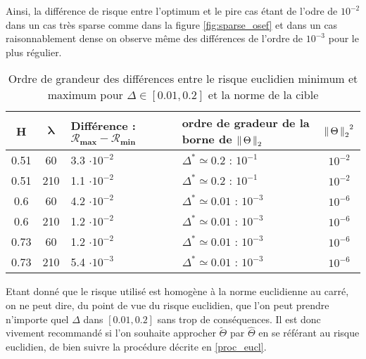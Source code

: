 Ainsi, la différence de risque entre l'optimum et le pire cas étant de l'odre de $10^{-2}$ dans un cas très sparse comme dans la figure \ref{fig:sparse_osef} et dans un cas raisonnablement dense on observe même des différences de l'ordre de $10^{-3}$ pour le plus régulier.


\begin{table}[H]
	\centering
	\begin{tabularx}{0.7\textwidth}{|cc|X|X|c|}
		\toprule
		\textbf{H} & $\mathbf{\lambda}$ & \textbf{Différence : } $\mathbf{\mathcal R_{max} - \mathcal R_{min}}$ & ordre de gradeur de la borne de $\left\lVert \, \Theta \, \right\rVert _ {2}$ & ${\left\lVert \, \Theta \, \right\rVert _ {2}}^2$ \\
		\midrule
		0.51       & 60                 & 3.3 $\cdot 10^{-2}$                                                   & $\Delta^* \simeq 0.2$ : $10^{-1}$                 & $10^{-2}$             \\
		0.51       & 210                & 1.1 $\cdot 10^{-2}$                                                   & $\Delta^* \simeq 0.2$ : $10^{-1}$                 & $10^{-2}$             \\
		\midrule
		0.6        & 60                 & 4.2 $\cdot 10^{-2}$                                                   & $\Delta^* \simeq 0.01$ : $10^{-3}$                & $10^{-6}$             \\
		0.6        & 210                & 1.2 $\cdot 10^{-2}$                                                   & $\Delta^* \simeq 0.01$ : $10^{-3}$                & $10^{-6}$             \\
		\midrule
		0.73       & 60                 & 1.2 $\cdot 10^{-2}$                                                   & $\Delta^* \simeq 0.01$ : $10^{-3}$                & $10^{-6}$             \\
		0.73       & 210                & 5.4 $\cdot 10^{-3}$                                                   & $\Delta^* \simeq 0.01$ : $10^{-3}$                & $10^{-6}$             \\
		\bottomrule
	\end{tabularx}
	\caption{Ordre de grandeur des différences entre le risque euclidien minimum et maximum pour $\Delta \in [0.01, 0.2]$ et la norme de la cible}
	\label{tab:ordre_grandeur_diff_R_norme}
\end{table}

Etant donné que le risque utilisé est homogène à la norme euclidienne au carré, on ne peut dire, du point de vue du risque euclidien, que l'on peut prendre n'importe quel $\Delta$ dans $[0.01, 0.2]$ sans trop de conséquences. Il est donc vivement recommandé si l'on souhaite approcher $\widetilde \Theta$ par $\widehat \Theta$ en se référant au risque euclidien, de bien suivre la procédure décrite en \ref{proc_eucl}.